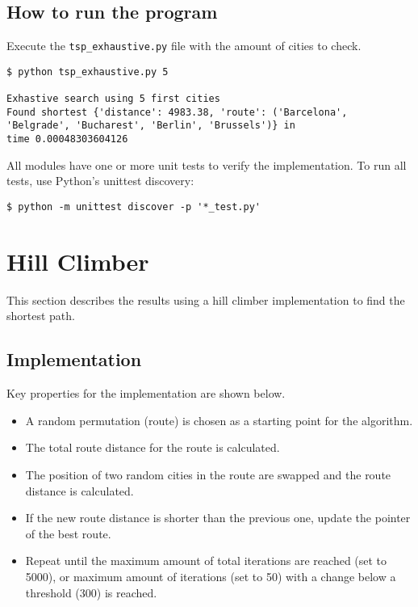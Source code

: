 \documentclass{article}
\begin{document}
\subsection*{How to run the program}

Execute the \texttt{tsp\_exhaustive.py} file with the amount of cities to check.

\begin{verbatim}
$ python tsp_exhaustive.py 5

Exhastive search using 5 first cities
Found shortest {'distance': 4983.38, 'route': ('Barcelona',
'Belgrade', 'Bucharest', 'Berlin', 'Brussels')} in
time 0.00048303604126
\end{verbatim}

\noindent All modules have one or more unit tests to verify the implementation. To run all tests, use Python's unittest discovery:

\begin{verbatim}
$ python -m unittest discover -p '*_test.py'
\end{verbatim}

\section*{Hill Climber}

This section describes the results using a hill climber implementation to find the shortest path.

\subsection*{Implementation}

Key properties for the implementation are shown below.

\begin{itemize}
    \item A random permutation (route) is chosen as a starting point for the algorithm.
    \item The total route distance for the route is calculated.
    \item The position of two random cities in the route are swapped and the route distance is calculated.
    \item If the new route distance is shorter than the previous one, update the pointer of the best route.
    \item Repeat until the maximum amount of total iterations are reached (set to 5000), or maximum amount of iterations (set to 50) with a change below a threshold (300) is reached.
\end{itemize}
\end{document}
